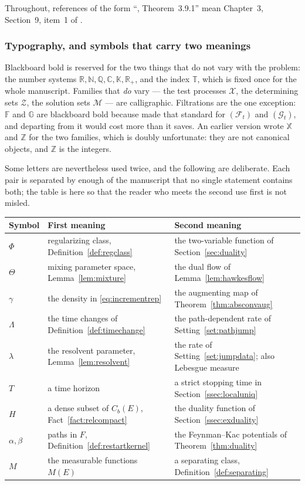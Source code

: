 \documentclass[11pt,a4paper]{article}
\theoremstyle{plain}
\theoremstyle{definition}
\theoremstyle{remark}
\newcommand{\R}{\mathbb{R}}
\newcommand{\N}{\mathbb{N}}
\newcommand{\Q}{\mathbb{Q}}
\newcommand{\Rp}{\R_+}
\newcommand{\T}{\mathbb{T}}                     %
\newcommand{\Meas}{M}                          %
\newcommand{\Cb}{C_b}                          %
\newcommand{\Filt}{\mathcal{F}}
\newcommand{\Gilt}{\mathcal{G}}
\newcommand{\K}{\mathbb{K}}
\newcommand{\C}{\mathbb{C}}
\newcommand{\XX}{\mathcal{X}}                  %
\newcommand{\ZZ}{\mathcal{Z}}                  %
\newcommand{\Msol}{\mathcal{M}}
\newcommand{\EK}{\cite{EK86}}
\newcommand{\JS}{\cite{JS03}}
\begin{document}
Throughout, references of the form ``\EK, Theorem~3.9.1'' mean Chapter~3,
Section~9, item~1 of \EK.

\subsubsection*{Typography, and symbols that carry two meanings}

Blackboard bold is reserved for the two things that do not vary with the problem:
the number systems $\R, \N, \Q, \C, \K, \Rp$, and the index $\T$, which is fixed
once for the whole manuscript.  Families that \emph{do} vary --- the test
processes $\XX$, the determining sets $\ZZ$, the solution sets $\Msol$ --- are
calligraphic.  Filtrations are the one exception: $\mathbb{F}$ and $\mathbb{G}$
are blackboard bold because \JS{} made that standard for $(\Filt_t)$ and
$(\Gilt_t)$, and departing from it would cost more than it saves.  An earlier
version wrote $\mathbb{X}$ and $\mathbb{Z}$ for the two families, which is
doubly unfortunate: they are not canonical objects, and $\mathbb{Z}$ is the
integers.

Some letters are nevertheless used twice, and the following are deliberate.  Each
pair is separated by enough of the manuscript that no single statement contains
both; the table is here so that the reader who meets the second use first is not
misled.

\medskip
\noindent
\begin{tabular}{@{}p{}p{}p{}@{}}
\toprule
\textbf{Symbol} & \textbf{First meaning} & \textbf{Second meaning} \\
\midrule
$\Phi$ & regularizing class, Definition~\ref{def:regclass}
       & the two-variable function of Section~\ref{sec:duality} \\
$\Theta$ & mixing parameter space, Lemma~\ref{lem:mixture}
       & the dual flow of Lemma~\ref{lem:hawkesflow} \\
$\gamma$ & the density in \eqref{eq:incrementrep}
       & the augmenting map of Theorem~\ref{thm:absconvaug} \\
$\Lambda$ & the time changes of Definition~\ref{def:timechange}
       & the path-dependent rate of Setting~\ref{set:pathjump} \\
$\lambda$ & the resolvent parameter, Lemma~\ref{lem:resolvent}
       & the rate of Setting~\ref{set:jumpdata}; also Lebesgue measure \\
$T$ & a time horizon
       & a strict stopping time in Section~\ref{ssec:localuniq} \\
$H$ & a dense subset of $\Cb(E)$, Fact~\ref{fact:relcompact}
       & the duality function of Section~\ref{ssec:exduality} \\
$\alpha,\beta$ & paths in $F$, Definition~\ref{def:restartkernel}
       & the Feynman--Kac potentials of Theorem~\ref{thm:duality} \\
$M$ & the measurable functions $\Meas(E)$
       & a separating class, Definition~\ref{def:separating} \\
\bottomrule
\end{tabular}
\end{document}
